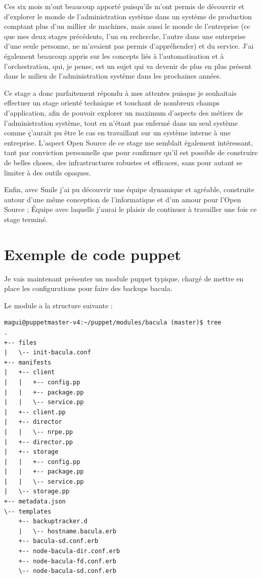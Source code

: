 \documentclass[14 pt]{extreport}
\begin{document}
Ces six mois m'ont beaucoup apporté puisqu'ils m'ont permis de découvrir et d'explorer le monde de l'administration système dans un système de production comptant plus d'un millier de machines, mais aussi le monde de l'entreprise (ce que mes deux stages précédents, l'un en recherche, l'autre dans une entreprise d'une seule personne, ne m'avaient pas permis d'appréhender) et du service. J'ai également beaucoup appris sur les concepts liés à l'automatisation et à l'orchestration, qui, je pense, est un sujet qui va devenir de plus en plus présent dans le milieu de l'administration système dans les prochaines années.

Ce stage a donc parfaitement répondu à mes attentes puisque je souhaitais effectuer un stage orienté technique et touchant de nombreux champs d'application, afin de pouvoir explorer un maximum d'aspects des métiers de l'administration système, tout en n'étant pas enfermé dans un seul système comme ç'aurait pu être le cas en travaillant sur un système interne à une entreprise. L'aspect Open Source de ce stage me semblait également intéressant, tant par conviction personnelle que pour confirmer qu'il est possible de construire de belles choses, des infrastructures robustes et efficaces, sans pour autant se limiter à des outils opaques.

Enfin, avec Smile j'ai pu découvrir une équipe dynamique et agréable, construite autour d'une même conception de l'informatique et d'un amour pour l'Open Source ; Équipe avec laquelle j'aurai le plaisir de continuer à travailler une fois ce stage terminé.

\appendix
\chapter{Exemple de code puppet}

Je vais maintenant présenter un module puppet typique, chargé de mettre en place les configurations pour faire des backups bacula.

Le module a la structure suivante :

\begin{Verbatim}[fontsize=\scriptsize]
magui@puppetmaster-v4:~/puppet/modules/bacula (master)$ tree
.
+-- files
|   \-- init-bacula.conf
+-- manifests
|   +-- client
|   |   +-- config.pp
|   |   +-- package.pp
|   |   \-- service.pp
|   +-- client.pp
|   +-- director
|   |   \-- nrpe.pp
|   +-- director.pp
|   +-- storage
|   |   +-- config.pp
|   |   +-- package.pp
|   |   \-- service.pp
|   \-- storage.pp
+-- metadata.json
\-- templates
    +-- backuptracker.d
    |   \-- hostname.bacula.erb
    +-- bacula-sd.conf.erb
    +-- node-bacula-dir.conf.erb
    +-- node-bacula-fd.conf.erb
    \-- node-bacula-sd.conf.erb
\end{Verbatim}
\end{document}
